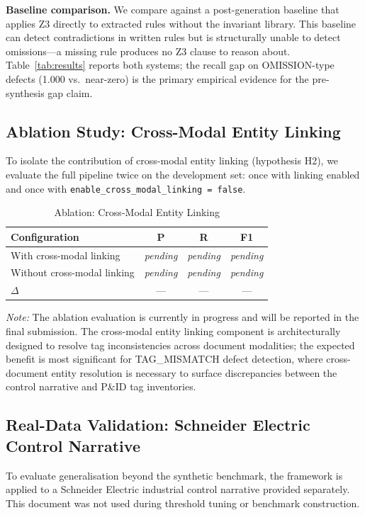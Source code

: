 \documentclass[conference]{IEEEtran}
\begin{document}
\textbf{Baseline comparison.} We compare against a post-generation baseline
that applies Z3 directly to extracted rules without the invariant library.
This baseline can detect contradictions in written rules but is structurally
unable to detect omissions---a missing rule produces no Z3 clause to
reason about. Table~\ref{tab:results} reports both systems; the recall
gap on OMISSION-type defects (1.000 vs.\ near-zero) is the primary
empirical evidence for the pre-synthesis gap claim.

\subsection{Ablation Study: Cross-Modal Entity Linking}
\label{sec:ablation}
To isolate the contribution of cross-modal entity linking (hypothesis H2),
we evaluate the full pipeline twice on the development set: once with
linking enabled and once with \texttt{enable\_cross\_modal\_linking = false}.

\begin{table}[t]
\caption{Ablation: Cross-Modal Entity Linking}
\label{tab:ablation}
\centering
\small
\begin{tabular}{@{}lccc@{}}
\toprule
\textbf{Configuration} & \textbf{P} & \textbf{R} & \textbf{F1} \\
\midrule
With cross-modal linking    & \emph{pending} & \emph{pending} & \emph{pending} \\
Without cross-modal linking & \emph{pending} & \emph{pending} & \emph{pending} \\
$\Delta$                    & ---            & ---            & ---            \\
\bottomrule
\end{tabular}
\end{table}

\emph{Note:} The ablation evaluation is currently in progress and will
be reported in the final submission. The cross-modal entity linking
component is architecturally designed to resolve tag inconsistencies
across document modalities; the expected benefit is most significant
for TAG\_MISMATCH defect detection, where cross-document entity
resolution is necessary to surface discrepancies between the control
narrative and P\&ID tag inventories.

\subsection{Real-Data Validation: Schneider Electric Control Narrative}
To evaluate generalisation beyond the synthetic benchmark, the framework is
applied to a Schneider Electric industrial control narrative provided
separately. This document was not used during threshold tuning or benchmark
construction.
\end{document}

